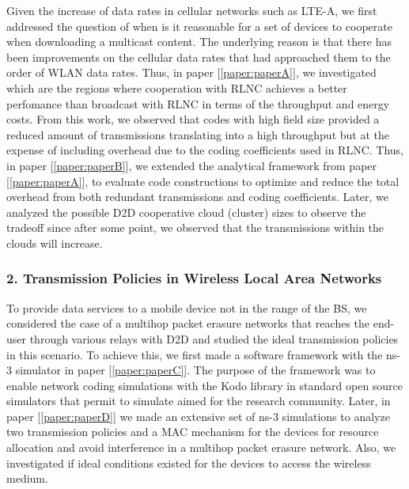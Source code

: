 Given the increase of data rates in cellular networks such as \ac{LTE-A}, we first addressed the question of when is it reasonable for a set of devices to cooperate when downloading a multicast content. The underlying reason is that there has been improvements on the cellular data rates that had approached them to the order of \ac{WLAN} data rates. Thus, in paper {[\ref{paper:paperA}]}, we investigated which are the regions where cooperation with \ac{RLNC} achieves a better perfomance than broadcast with \ac{RLNC} in terms of the throughput and energy costs. From this work, we observed that codes with high field size provided a reduced amount of transmissions translating into a high throughput but at the expense of including overhead due to the coding coefficients used in \ac{RLNC}. Thus, in paper {[\ref{paper:paperB}]}, we extended the analytical framework from paper {[\ref{paper:paperA}]}, to evaluate code constructions to optimize and reduce the total overhead from both redundant transmissions and coding coefficients. Later, we analyzed the possible \ac{D2D} cooperative cloud (cluster) sizes to observe the tradeoff since after some point, we observed that the transmissions within the clouds will increase.

\subsubsection{2. Transmission Policies in Wireless Local Area Networks}

To provide data services to a mobile device not in the range of the \ac{BS}, we considered the case of a multihop packet erasure networks that reaches the end-user through various relays with \ac{D2D} and studied the ideal transmission policies in this scenario. To achieve this, we first made a software framework with the ns-3 simulator \cite{kodons3link,kodons3tutorial} in paper {[\ref{paper:paperC}]}. The purpose of the framework was to enable network coding simulations with the Kodo library in standard open source simulators that permit to simulate aimed for the research community. Later, in paper {[\ref{paper:paperD}]} we made an extensive set of ns-3 simulations to analyze two transmission policies and a \ac{MAC} mechanism for the devices for resource allocation and avoid interference in a multihop packet erasure network. Also, we investigated if ideal conditions existed for the devices to access the wireless medium.

\clearpage